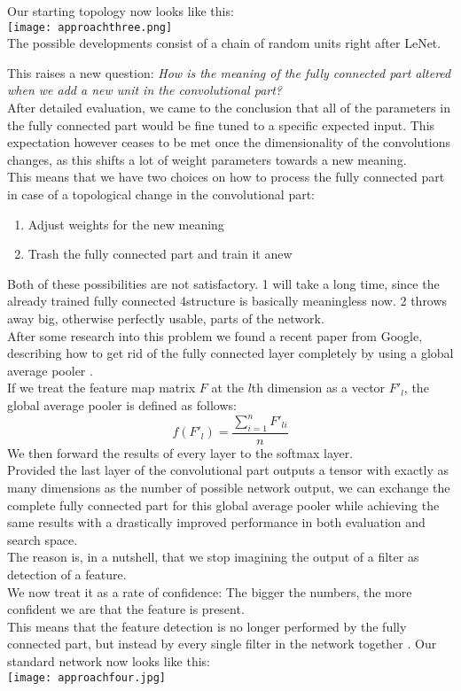 Our starting topology now looks like this:\\
\texttt{[image: approachthree.png]}\\
The possible developments consist of a chain of random units right after LeNet.

This raises a new question: \emph{How is the meaning of the fully connected part altered when we add a new unit in the convolutional part?}\\
After detailed evaluation, we came to the conclusion that all of the parameters in the fully connected part would be fine tuned to a specific expected input. This expectation however ceases to be met once the dimensionality of the convolutions changes, as this shifts a lot of weight parameters towards a new meaning.\\
This means that we have two choices on how to process the fully connected part in case of a topological change in the convolutional part:
\begin{enumerate}
	\item{Adjust weights for the new meaning}
	\item{Trash the fully connected part and train it anew}
\end{enumerate}  
Both of these possibilities are not satisfactory. 1 will take a long time, since the already trained fully connected 4structure is basically meaningless now. 2 throws away big, otherwise perfectly usable, parts of the network.\\
After some research into this problem we found a recent paper from Google, describing how to get rid of the fully connected layer completely by using a global average pooler \cite{Lin2014}.\\
If we treat the feature map matrix \(F\) at the \(l\)th dimension as a vector \(F'_l\), the global average pooler is defined as follows:
\[ f(F'_l) = \frac{\sum_{i = 1}^{n} F'_{li}}{n} \]
We then forward the results of every layer to the softmax layer.\\
Provided the last layer of the convolutional part outputs a tensor with exactly as many dimensions as the number of possible network output, we can exchange the complete fully connected part for this global average pooler while achieving the same results with a drastically improved performance in both evaluation and search space. \cite{Lin2014}\\
The reason is, in a nutshell, that we stop imagining the output of a filter as detection of a feature.\\
We now treat it as a rate of confidence: The bigger the numbers, the more confident we are that the feature is present.\\
This means that the feature detection is no longer performed by the fully connected part, but instead by every single filter in the network together \cite{Lin2014}.
Our standard network now looks like this:\\
\texttt{[image: approachfour.jpg]}\\

